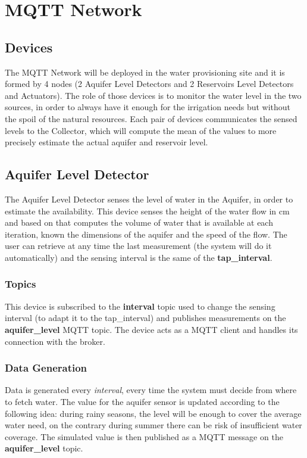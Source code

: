 \section{MQTT Network}

\subsection{Devices}
The MQTT Network will be deployed in the water provisioning site and it is formed by 4 nodes (2 Aquifer Level Detectors and 2 Reservoirs Level Detectors and Actuators). The role of those devices is to monitor the water level in the two sources, in order to always have it enough for the irrigation needs but without the spoil of the natural resources. Each pair of devices communicates the sensed levels  to the Collector, which will compute the mean of the values to more precisely estimate the actual aquifer and reservoir level.


\subsection{Aquifer Level Detector}
The Aquifer Level Detector senses the level of water in the Aquifer, in order to estimate the availability. This device senses the height of the water flow in cm and based on that computes the volume of water that is available at each iteration, known the dimensions of the aquifer and the speed of the flow. The user can retrieve at any time the last measurement (the system will do it automatically) and the sensing interval is the same of the \textbf{tap\_interval}.

\subsubsection{Topics}
This device is subscribed to the \textbf{interval} topic used to change the sensing interval (to adapt it to the tap\_interval) and publishes measurements on the \textbf{aquifer\_level} MQTT topic.
The device acts as a MQTT client and handles its connection with the broker.

\subsubsection{Data Generation}
Data is generated every \textit{interval}, every time the system must decide from where to fetch water. The value for the aquifer sensor is updated according to the following idea: during rainy seasons, the level will be enough to cover the average water need, on the contrary during summer there can be risk of insufficient water coverage. The simulated value is then published as a MQTT message on the \textbf{aquifer\_level} topic.

